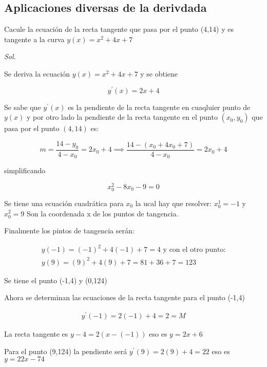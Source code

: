\subsection{Aplicaciones diversas de la derivdada}

\begin{example}
	Cacule la ecuación de la recta tangente que pasa por el punto (4,14)
	y es tangente a la curva $y(x)=x^2+4x+7$
\end{example}

\textit{ Sol. }

Se deriva la ecuación $y(x)=x^2+4x+7$ y se obtiene

\begin{equation*}
	y^{\prime}(x)=2x+4
\end{equation*}

Se sabe que $y^{\prime}(x)$ es la pendiente de la recta tangente en cuaqluier punto de $y(x)$
y por otro lado la pendiente de la recta tangente en el punto $(x_0,y_0)$ que pasa por el punto
$(4,14)$ es:

\begin{equation*}
	m=\frac{14-y_0}{4-x_0}=2x_0+4\implies \frac{14-(x_0+4x_0+7)}{4-x_0}=2x_0+4
\end{equation*}

simplificando

\begin{equation*}
	x_0^2-8x_0-9=0
\end{equation*}

Se tiene una ecuación cuadrática para $x_0$ la ucal hay que resolver:
$x_0^1=-1$ y $x_0^2=9$ Son la coordenada x de los puntos de tangencia.

Finalmente los pintos de tangencia serán:

\begin{align*}
	y(-1)=(-1)^2+4(-1)+7=4\text{ y con el otro punto:} \\
	y(9)=(9)^2+4(9)+7=81+36+7=123
\end{align*}

Se tiene el punto (-1,4) y (0,124)

Ahora se determinan las ecuaciones de la recta tangente para el punto (-1,4)

\begin{align*}
	y^{\prime}(-1)=2(-1)+4=2=M
\end{align*}

La recta tangente es $y-4=2(x-(-1))$ eso es $y=2x+6$

Para el punto (9,124) la pendiente será $y^{\prime}(9)=2(9)+4=22$ eso es $y=22x-74$

